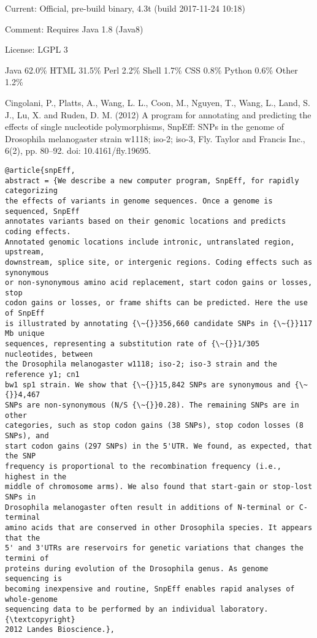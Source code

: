 \documentclass[]{article}
\begin{document}
Current: Official, pre-build binary, 4.3t (build 2017-11-24 10:18)

Comment: Requires Java 1.8 (Java8)

License: LGPL 3

Java 62.0\% HTML 31.5\% Perl 2.2\% Shell 1.7\% CSS 0.8\% Python 0.6\% Other 1.2\%

Cingolani, P., Platts, A., Wang, L. L., Coon, M., Nguyen, T., Wang, L., Land, S. J., Lu, X. and Ruden, D. M. (2012) A program for annotating and predicting the effects of single nucleotide polymorphisms, SnpEff: SNPs in the genome of Drosophila melanogaster strain w1118; iso-2; iso-3, Fly. Taylor and Francis Inc., 6(2), pp. 80–92. doi: 10.4161/fly.19695.

\begin{verbatim}
@article{snpEff,
abstract = {We describe a new computer program, SnpEff, for rapidly categorizing
the effects of variants in genome sequences. Once a genome is sequenced, SnpEff
annotates variants based on their genomic locations and predicts coding effects.
Annotated genomic locations include intronic, untranslated region, upstream,
downstream, splice site, or intergenic regions. Coding effects such as synonymous
or non-synonymous amino acid replacement, start codon gains or losses, stop
codon gains or losses, or frame shifts can be predicted. Here the use of SnpEff
is illustrated by annotating {\~{}}356,660 candidate SNPs in {\~{}}117 Mb unique
sequences, representing a substitution rate of {\~{}}1/305 nucleotides, between
the Drosophila melanogaster w1118; iso-2; iso-3 strain and the reference y1; cn1
bw1 sp1 strain. We show that {\~{}}15,842 SNPs are synonymous and {\~{}}4,467
SNPs are non-synonymous (N/S {\~{}}0.28). The remaining SNPs are in other
categories, such as stop codon gains (38 SNPs), stop codon losses (8 SNPs), and
start codon gains (297 SNPs) in the 5'UTR. We found, as expected, that the SNP
frequency is proportional to the recombination frequency (i.e., highest in the
middle of chromosome arms). We also found that start-gain or stop-lost SNPs in
Drosophila melanogaster often result in additions of N-terminal or C-terminal
amino acids that are conserved in other Drosophila species. It appears that the
5' and 3'UTRs are reservoirs for genetic variations that changes the termini of
proteins during evolution of the Drosophila genus. As genome sequencing is
becoming inexpensive and routine, SnpEff enables rapid analyses of whole-genome
sequencing data to be performed by an individual laboratory. {\textcopyright}
2012 Landes Bioscience.},

\end{verbatim}
\end{document}
